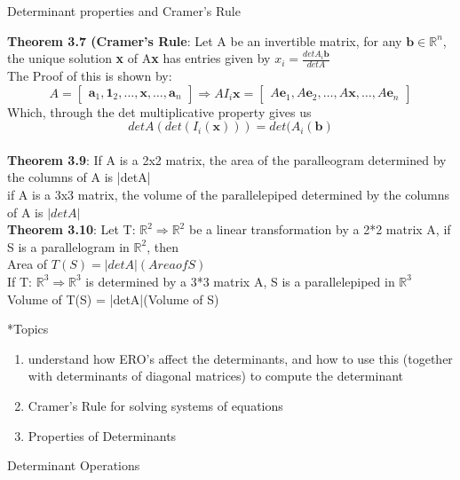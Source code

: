 \documentclass[a4paper, 12pt]{article}
\begin{document}
\begin{section}{Determinant properties and Cramer's Rule}
\begin{subsection}
\noindent\textbf{Theorem 3.7 (Cramer's Rule}: Let A be an invertible 
matrix, for any $\textbf{b}\in\mathbb{R}^{n}$, the unique solution
\textbf{x} of A\textbf{x} has entries given by $x_{i}=\frac{detA_{i}
\textbf{b}}{detA}$\\
The Proof of this is shown by:
\begin{equation}
A=\begin{bmatrix} \textbf{a}_{1}, \textbf{1}_{2},\dots,\textbf{x},
\dots, \textbf{a}_{n} \end{bmatrix} \Rightarrow AI_{i}\textbf{x}=
\begin{bmatrix} A\textbf{e}_{1},A\textbf{e}_{2},\dots,A\textbf{x} 
,\dots,A\textbf{e}_{n} \end{bmatrix} 
\end{equation} Which, through the det multiplicative property gives us
\begin{equation}
	detA(det(I_{i}(\textbf{x})))=det(A_{i}(\textbf{b})
\end{equation} \\
\noindent\textbf{Theorem 3.9}: If A is a 2x2 matrix, the area of the
paralleogram determined by the columns of A is |detA| \\
\noindent if A is a 3x3 matrix, the volume of the parallelepiped determined
by the columns of A is $\lvert detA\rvert$ 
\\
\noindent\textbf{Theorem 3.10}: Let T: $\mathbb{R}^{2}\Rightarrow \mathbb{R}^{2}$ 
be a linear transformation by a 2*2 matrix A, if S is a 
parallelogram in $\mathbb{R}^{2}$, then \\
Area of $T(S) = |detA|(Area of S)$ \\
If T: $\mathbb{R}^{3}\Rightarrow \mathbb{R}^{3}$ is determined by a 3*3
matrix A, S is a parallelepiped in $\mathbb{R}^{3}$\\
Volume of T(S) = |detA|(Volume of S)
\end{subsection}
\begin{subsection}*{Topics}
\begin{enumerate}
\item{understand how ERO's affect the determinants, and how to 
use this (together with determinants of diagonal matrices) 
to compute the determinant}
\item{Cramer's Rule for solving systems of equations}
\item{Properties of Determinants}
\end{enumerate}
\end{subsection}
\begin{subsection}{Determinant Operations}

\end{subsection}
\end{section}
\end{document}

